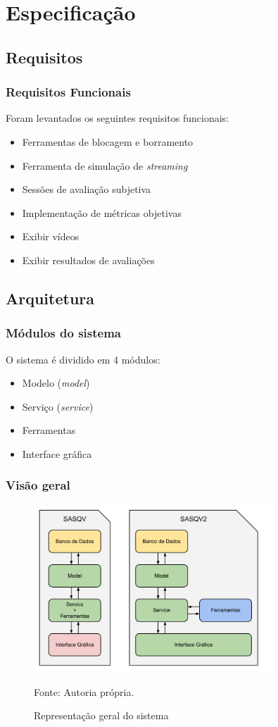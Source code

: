 \section{Especificação}


\subsection{Requisitos}
    \begin{frame}\frametitle{Requisitos Funcionais}
	Foram levantados os seguintes requisitos funcionais:
		\begin{itemize}
			\item Ferramentas de blocagem e borramento
			\item Ferramenta de simulação de \emph{streaming}
			\item Sessões de avaliação subjetiva
			\item Implementação de métricas objetivas
			\item Exibir vídeos
			\item Exibir resultados de avaliações
		\end{itemize}
    \end{frame}
    
\subsection{Arquitetura}
    \begin{frame}\frametitle{Módulos do sistema}
	O sistema é dividido em 4 módulos:
		\begin{itemize}
			\item Modelo (\emph{model})
			\item Serviço (\emph{service})
			\item Ferramentas
			\item Interface gráfica
		\end{itemize}
    \end{frame}
    
	\begin{frame}\frametitle{Visão geral}
		\begin{figure}
			\includegraphics[width=0.8\textwidth]{./imgs/arquitetura.png}
			\caption{Representação geral do sistema}
			\tiny
			Fonte: Autoria própria.
		\end{figure}
	\end{frame}
